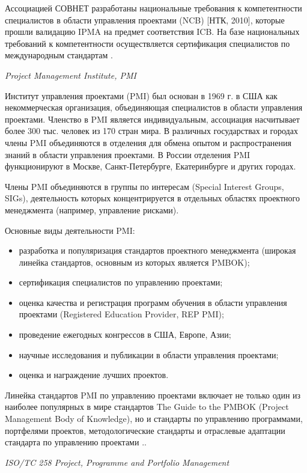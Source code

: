 Ассоциацией СОВНЕТ разработаны национальные требования к компетентности специалистов в области управления проектами (NCB) [НТК, 2010], которые прошли валидацию IPMA на предмет соответствия ICB. На базе национальных требований к компетентности осуществляется сертификация специалистов по международным стандартам \cite[35]{aleshin}.

\textit{Project Management Institute, PMI}

Институт управления проектами (PMI) был основан в 1969 г. в США как некоммерческая организация, объединяющая специалистов в области управления проектами.
Членство в PMI является индивидуальным, ассоциация насчитывает более 300 тыс. человек из 170 стран мира.
В различных государствах и городах члены PMI объединяются в отделения для обмена опытом и распространения знаний в области управления проектами.
В России отделения PMI функционируют в Москве, Санкт-Петербурге, Екатеринбурге и других городах.

Члены PMI объединяются в группы по интересам (Special Interest Groups, SIGs), деятельность которых концентрируется в отдельных областях проектного менеджмента (например, управление рисками).

Основные виды деятельности PMI:
\begin{itemize}
	\item разработка и популяризация стандартов проектного менеджмента (широкая линейка стандартов, основным из которых является PMBOK);
	\item сертификация специалистов по управлению проектами;
	\item оценка качества и регистрация программ обучения в области управления проектами (Registered Education Provider, REP PMI);
	\item проведение ежегодных конгрессов в США, Европе, Азии;
	\item научные исследования и публикации в области управления проектами;
	\item оценка и награждение лучших проектов.
\end{itemize}

Линейка стандартов PMI по управлению проектами включает не только один из наиболее популярных в мире стандартов The Guide to the PMBOK (Project Management Body of Knowledge), но и стандарты по управлению программами, портфелями проектов, методологические стандарты и отраслевые адаптации стандарта по управлению проектами \cite[36]{aleshin}..

\textit{ISO/TC 258 Project, Programme and Portfolio Management}

